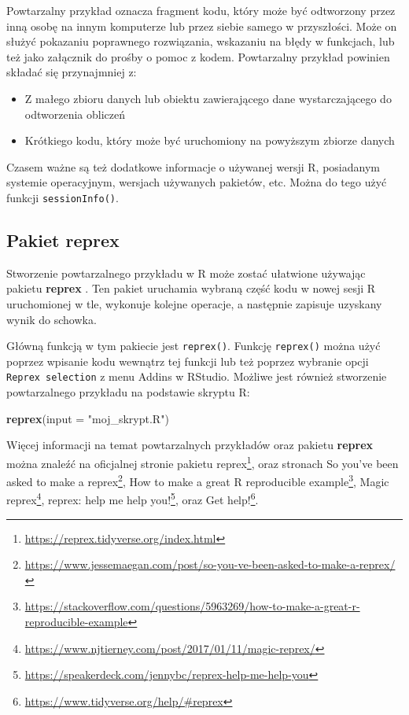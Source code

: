 \documentclass[paper=6in:9in,pagesize=pdftex,headinclude=on,footinclude=on,10pt]{scrbook}
\newenvironment{Shaded}{\begin{snugshade}}{\end{snugshade}}
\newcommand{\DataTypeTok}[1]{\textcolor[rgb]{0.13,0.29,0.53}{#1}}
\newcommand{\KeywordTok}[1]{\textcolor[rgb]{0.13,0.29,0.53}{\textbf{#1}}}
\newcommand{\NormalTok}[1]{#1}
\newcommand{\StringTok}[1]{\textcolor[rgb]{0.31,0.60,0.02}{#1}}
\DeclareRobustCommand{\href}[2]{#2\footnote{\url{#1}}}
\providecommand{\tightlist}{%
  \setlength{\itemsep}{0pt}\setlength{\parskip}{0pt}}
\begin{document}
Powtarzalny przykład oznacza fragment kodu, który może być odtworzony przez inną osobę na innym komputerze lub przez siebie samego w przyszłości.
Może on służyć pokazaniu poprawnego rozwiązania, wskazaniu na błędy w funkcjach, lub też jako załącznik do prośby o pomoc z kodem.
Powtarzalny przykład powinien składać się przynajmniej z:

\begin{itemize}
\tightlist
\item
  Z małego zbioru danych lub obiektu zawierającego dane wystarczającego do odtworzenia obliczeń
\item
  Krótkiego kodu, który może być uruchomiony na powyższym zbiorze danych
\end{itemize}

Czasem ważne są też dodatkowe informacje o używanej wersji R, posiadanym systemie operacyjnym, wersjach używanych pakietów, etc.
Można do tego użyć funkcji \texttt{sessionInfo()}.

\hypertarget{pakiet-reprex}{%
\subsection{\texorpdfstring{Pakiet \textbf{reprex}}{Pakiet reprex}}\label{pakiet-reprex}}

Stworzenie powtarzalnego przykładu w R może zostać ułatwione używając pakietu \textbf{reprex} \citep{R-reprex}.
Ten pakiet uruchamia wybraną część kodu w nowej sesji R uruchomionej w tle, wykonuje kolejne operacje, a następnie zapisuje uzyskany wynik do schowka.

Główną funkcją w tym pakiecie jest \texttt{reprex()}.
Funkcję \texttt{reprex()} można użyć poprzez wpisanie kodu wewnątrz tej funkcji lub też poprzez wybranie opcji \texttt{Reprex\ selection} z menu Addins w RStudio.
Możliwe jest również stworzenie powtarzalnego przykładu na podstawie skryptu R:

\begin{Shaded}
\begin{Highlighting}[]
\KeywordTok{reprex}\NormalTok{(}\DataTypeTok{input =} \StringTok{"moj_skrypt.R"}\NormalTok{)}
\end{Highlighting}
\end{Shaded}

Więcej informacji na temat powtarzalnych przykładów oraz pakietu \textbf{reprex} można znaleźć na \href{https://reprex.tidyverse.org/index.html}{oficjalnej stronie pakietu reprex}, oraz stronach \href{https://www.jessemaegan.com/post/so-you-ve-been-asked-to-make-a-reprex/}{So you've been asked to make a reprex}, \href{https://stackoverflow.com/questions/5963269/how-to-make-a-great-r-reproducible-example}{How to make a great R reproducible example}, \href{https://www.njtierney.com/post/2017/01/11/magic-reprex/}{Magic reprex}, \href{https://speakerdeck.com/jennybc/reprex-help-me-help-you}{reprex: help me help you!}, oraz \href{https://www.tidyverse.org/help/\#reprex}{Get help!}.
\end{document}
